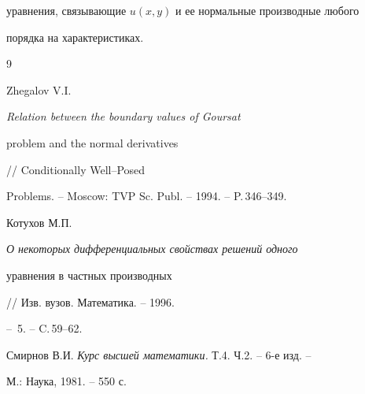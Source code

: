 уравнения, связывающие $u(x,y)$ и ее нормальные производные любого


порядка на характеристиках.








\begin{thebibliography}{9}







Zhegalov V.I. {\em Relation between the boundary values of Goursat


problem and the normal derivatives} // Conditionally Well--Posed


Problems. -- Moscow: TVP Sc. Publ. -- 1994. -- P.\,346--349.




Котухов М.П. {\em О некоторых дифференциальных свойствах решений одного


уравнения в частных производных} // Изв. вузов. Математика. -- 1996.


-- \No\,5. -- C.\,59--62.




Смирнов В.И. {\em Курс высшей математики.} Т.4. Ч.2. -- 6-е изд. --


М.: Наука, 1981. -- 550 с.





\end{thebibliography}





\vskip 1cm












\label{end}





